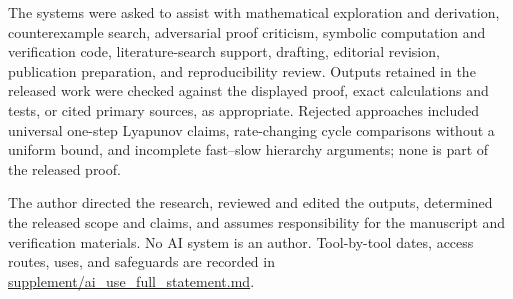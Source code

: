 The systems were asked to assist with mathematical exploration and derivation,
counterexample search, adversarial proof criticism, symbolic computation and
verification code, literature-search support, drafting, editorial revision,
publication preparation, and reproducibility review.  Outputs retained in the
released work were checked against the displayed proof, exact calculations and
tests, or cited primary sources, as appropriate.  Rejected approaches included universal
one-step Lyapunov claims, rate-changing cycle comparisons without a uniform
bound, and incomplete fast--slow hierarchy arguments; none is part of the
released proof.

The author directed the research, reviewed and edited the outputs, determined
the released scope and claims, and assumes responsibility for the manuscript
and verification materials.  No AI system is an author.  Tool-by-tool dates,
access routes, uses, and safeguards are recorded in
\href{https://github.com/AlecKriebel/Math/blob/bimolecular-positive-recurrence-v1.2.4/bimolecular_positive_recurrence_submission_v1_2_4/supplement/ai_use_full_statement.md}{supplement/ai\_use\_full\_statement.md}.



